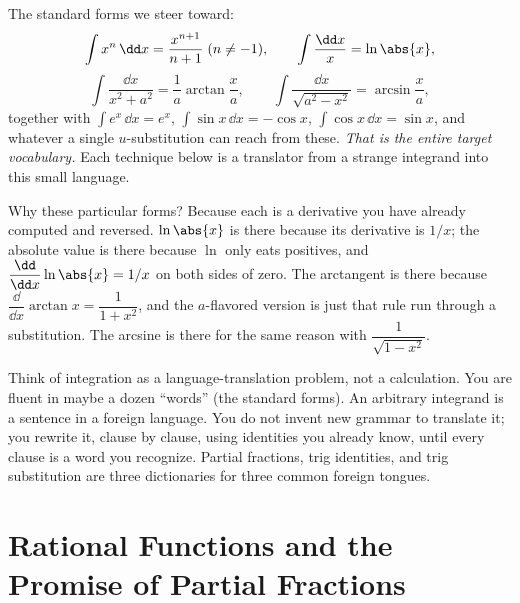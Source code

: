 \begin{focusbox}
The standard forms we steer toward:
\[
\int x^n\,\dd x = \frac{x^{n+1}}{n+1}\;(n\neq -1),
\qquad
\int \frac{\dd x}{x} = \ln\abs{x},
\]
\[
\int \frac{\dd x}{x^2 + a^2} = \frac{1}{a}\arctan\!\frac{x}{a},
\qquad
\int \frac{\dd x}{\sqrt{a^2 - x^2}} = \arcsin\!\frac{x}{a},
\]
together with $\int e^x\,\dd x = e^x$, $\int \sin x\,\dd x = -\cos x$,
$\int \cos x\,\dd x = \sin x$, and whatever a single $u$-substitution can
reach from these. \emph{That is the entire target vocabulary.} Each technique
below is a translator from a strange integrand into this small language.
\end{focusbox}

Why these particular forms? Because each is a derivative you have already
computed and reversed. $\ln\abs{x}$ is there because its derivative is $1/x$;
the absolute value is there because $\ln$ only eats positives, and
$\dfrac{\dd}{\dd x}\ln\abs{x} = 1/x$ on both sides of zero. The arctangent is
there because $\dfrac{\dd}{\dd x}\arctan x = \dfrac{1}{1+x^2}$, and the
$a$-flavored version is just that rule run through a substitution. The
arcsine is there for the same reason with $\dfrac{1}{\sqrt{1-x^2}}$.

\begin{intuitionbox}
Think of integration as a language-translation problem, not a calculation. You
are fluent in maybe a dozen ``words'' (the standard forms). An arbitrary
integrand is a sentence in a foreign language. You do not invent new grammar
to translate it; you rewrite it, clause by clause, using identities you
already know, until every clause is a word you recognize. Partial fractions,
trig identities, and trig substitution are three dictionaries for three
common foreign tongues.
\end{intuitionbox}

\section{Rational Functions and the Promise of Partial Fractions}
\label{ch24:rational-intro}

